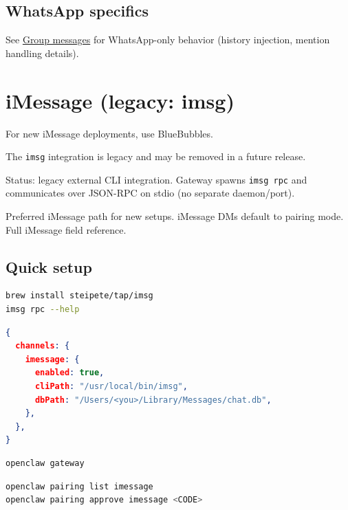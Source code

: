 \subsection{WhatsApp specifics}


See \href{/channels/group-messages}{Group messages} for WhatsApp-only behavior (history injection, mention handling details).


\clearpage

\section{iMessage (legacy: imsg)}


For new iMessage deployments, use BlueBubbles.

The \texttt{imsg} integration is legacy and may be removed in a future release.

Status: legacy external CLI integration. Gateway spawns \texttt{imsg rpc} and communicates over JSON-RPC on stdio (no separate daemon/port).

Preferred iMessage path for new setups.
iMessage DMs default to pairing mode.
Full iMessage field reference.

\subsection{Quick setup}



\begin{lstlisting}[language=bash]
brew install steipete/tap/imsg
imsg rpc --help
\end{lstlisting}




\begin{lstlisting}[language=json]
{
  channels: {
    imessage: {
      enabled: true,
      cliPath: "/usr/local/bin/imsg",
      dbPath: "/Users/<you>/Library/Messages/chat.db",
    },
  },
}
\end{lstlisting}




\begin{lstlisting}[language=bash]
openclaw gateway
\end{lstlisting}




\begin{lstlisting}[language=bash]
openclaw pairing list imessage
openclaw pairing approve imessage <CODE>
\end{lstlisting}


